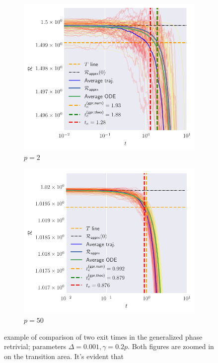 \begin{figure}
  \centering
  \begin{subfigure}{0.8\textwidth}
    \includegraphics[width=1.\textwidth]{figures/spherical/gpr-p2.pdf}
    \caption{\(p=2\)}
  \end{subfigure}
  \begin{subfigure}{0.8\textwidth}
    \includegraphics[width=1.\textwidth]{figures/spherical/gpr-p50.pdf}
    \caption{\(p=50\)}
  \end{subfigure}

  \caption{
    example of comparison of two exit times in the generalized phase retrivial; parameters \(\Delta=\num{0.001}, \gamma=0.2p\).
    Both figures are zoomed in on the transition area. It's evident that 
  }
  \label{fig:spherical-generalized-phase-retrivial}
\end{figure}



